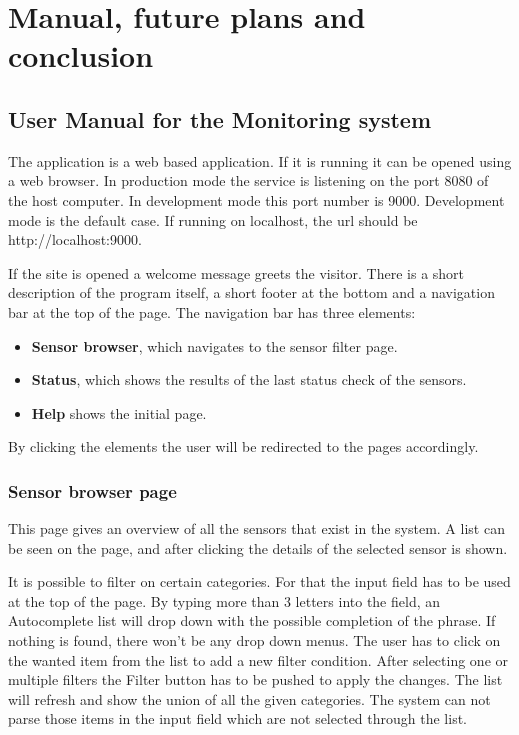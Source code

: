 \chapter{Manual, future plans and conclusion}
\section{User Manual for the Monitoring system}
The application is a web based application. If it is running it can be opened using a web browser. In production mode the service is listening on the port 8080 of the host computer. In development mode this port number is 9000. Development mode is the default case. If running on localhost, the url should be http://localhost:9000.

If the site is opened a welcome message greets the visitor. There is a short description of the program itself, a short footer at the bottom and a navigation bar at the top of the page. The navigation bar has three elements:
\begin{itemize}
\item \textbf{Sensor browser}, which navigates to the sensor filter page.
\item \textbf{Status}, which shows the results of the last status check of the sensors.
\item \textbf{Help} shows the initial page.
\end{itemize}
By clicking the elements the user will be redirected to the pages accordingly.

\subsection{Sensor browser page}
This page gives an overview of all the sensors that exist in the system. A list can be seen on the page, and after clicking the details of the selected sensor is shown. 

It is possible to filter on certain categories. For that the input field has to be used at the top of the page. By typing more than 3 letters into the field, an Autocomplete list will drop down with the possible completion of the phrase. If nothing is found, there won't be any drop down menus. The user has to click on the wanted item from the list to add a new filter condition. After selecting one or multiple filters the Filter button has to be pushed to apply the changes. The list will refresh and show the union of all the given categories. The system can not parse those items in the input field which are not selected through the list.  

